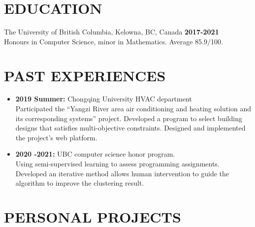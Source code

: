 \documentclass{res}
\begin{document}

\address{\textbf{Email:} jimmy123good@hotmail.com \\
        \textbf{Github: }https://github.com/ailrk \\
         \textbf{Blog:}    https://ailrk.github.io/home \\
         \textbf{Contact:}  +1 (250) 899 2600}
\begin{resume}

\section{EDUCATION}
The University of British Columbia, Kelowna, BC, Canada  \hspace{1.2in} \textbf{2017-2021}\\
    Honours in Computer Science, minor in Mathematics. Average 85.9/100. \\

\vspace{-0.2in}
\section{PAST EXPERIENCES}
\begin{itemize}[leftmargin=-.1in]
    \item \textbf{2019 Summer:} Chongqing University HVAC department
        \vspace{0.05in}\\ Participated the ``Yangzi River area air conditioning and heating solution and its corresponding systems'' project. Developed a program to select building designs that satisfies multi-objective constraints.
     Designed and implemented the project's web platform. \\
    \item \textbf{2020 -2021: } UBC computer science honor program. \\
        Using semi-supervised learning to assess programming assignments. Developed an iterative method allows human intervention to guide the algorithm to improve the clustering result. \\


\end{itemize}

\vspace{-0.2in}
\section{PERSONAL PROJECTS}


\end{resume}
\end{document}
